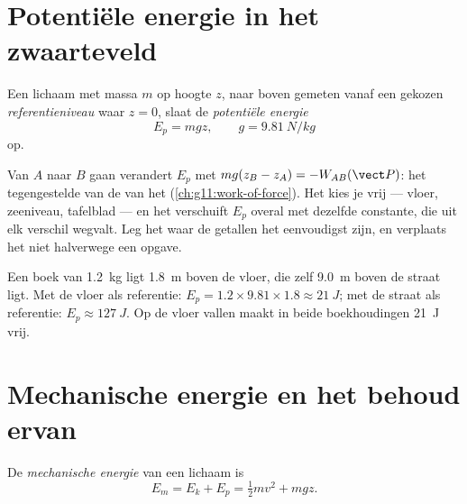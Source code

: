 \section{Potentiële energie in het zwaarteveld}

\begin{definition}\label{def:g11:mechanical-energy:potential}
Een lichaam met massa $m$ op hoogte $z$, naar boven gemeten vanaf een
gekozen \emph{referentieniveau} waar $z = 0$,
slaat de \emph{potentiële energie}
\[
E_p = m g z, \qquad g = \qty{9.81}{N/kg}
\]
op.
\end{definition}

\begin{remark}\label{rem:g11:mechanical-energy:reference}
Van $A$ naar $B$ gaan verandert $E_p$ met
$mg(z_B - z_A) = -W_{AB}(\vect P)$: het tegengestelde van de  van
het  (\cref{ch:g11:work-of-force}). Het  kies je
vrij --- vloer, zeeniveau, tafelblad --- en het verschuift $E_p$ overal
met dezelfde constante, die uit elk verschil wegvalt. Leg het waar de
getallen het eenvoudigst zijn, en verplaats het niet halverwege een
opgave.
\end{remark}

\begin{example}\label{ex:g11:mechanical-energy:shelf}
Een boek van \qty{1.2}{kg} ligt \qty{1.8}{m} boven de vloer, die zelf
\qty{9.0}{m} boven de straat ligt. Met de vloer als referentie:
$E_p = 1.2 \times 9.81 \times 1.8 \approx \qty{21}{J}$; met de straat als
referentie: $E_p \approx \qty{127}{J}$. Op de vloer vallen maakt in beide
boekhoudingen \qty{21}{J} vrij.
\end{example}

\section{Mechanische energie en het behoud ervan}

\begin{definition}\label{def:g11:mechanical-energy:em}
De \emph{mechanische energie} van een lichaam
is
\[
E_m = E_k + E_p = \tfrac12 m v^2 + m g z .
\]
\end{definition}

